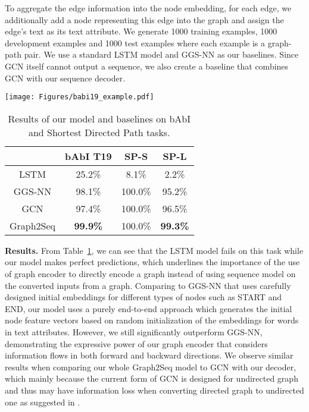 \documentclass{article} \usepackage{iclr2019_conference,times}
\begin{document}
To aggregate the edge information into the node embedding, for each edge,  we additionally add a node representing this edge into the graph and assign the edge's text as its text attribute.
We generate 1000 training examples, 1000 development examples and 1000 test examples where each example is a graph-path pair. We use a standard LSTM model \citep{hochreiter1997long} and GGS-NN \citep{li2015gated} as our baselines. Since GCN \citep{kipf2016semi} itself cannot output a sequence, we also create a baseline that combines GCN with our sequence decoder. 


\begin{table}[t!]
\begin{minipage}[t]{0.48\linewidth}
    \vspace{0pt}
    \centering\texttt{[image: Figures/babi19\_example.pdf]}
    \label{fig:babi_19_example}
  \end{minipage}
    \begin{minipage}[t]{0.5\linewidth}
     \vspace{0pt}
    \centering
    \small
    \begin{tabular}{cc|cc}
    & bAbI T19 & SP-S & SP-L \\
\hline
    LSTM & 25.2\% & 8.1\% & 2.2\% \\
    GGS-NN & 98.1\% & 100.0\% & 95.2\% \\
    GCN & 97.4\% & 100.0\% & 96.5\%\\
    Graph2Seq & \textbf{99.9\%} & 100.0\% & \textbf{99.3\%} \\
    \hline
\end{tabular}
    \caption{Results of our model and baselines on bAbI and Shortest Directed Path tasks.}
    \label{tab:babi_exp}
  \end{minipage}\vspace{-.5cm}
\end{table}


\textbf{Results.} From Table~\ref{tab:babi_exp},
we can see that the LSTM model fails on this task while our model makes perfect predictions, which underlines the importance of the use of graph encoder to directly encode a graph instead of using sequence model on the converted inputs from a graph. Comparing to GGS-NN that uses carefully designed initial embeddings for different types of nodes such as START and END, our model uses a purely end-to-end approach which generates the initial node feature vectors based on random initialization of the embeddings for words in text attributes. However, we still significantly outperform GGS-NN, demonstrating the expressive power of our graph encoder that considers information flows in both forward and backward directions. We observe similar results when comparing our whole Graph2Seq model to GCN with our decoder, which mainly because the current form of GCN \citep{kipf2016semi} is designed for undirected graph and thus may have information loss when converting directed graph to undirected one as suggested in \citep{kipf2016semi}. 
\end{document}
